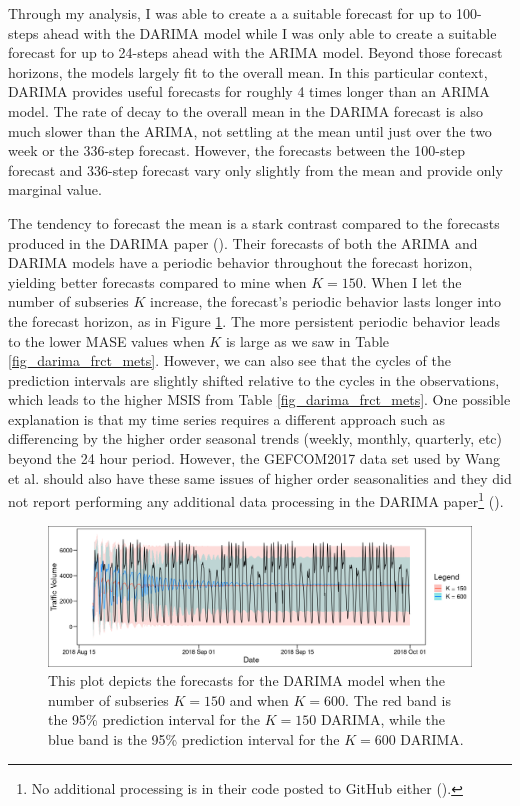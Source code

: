 \documentclass[
]{article}
\begin{document}
Through my analysis, I was able to create a a suitable forecast for up to 100-steps ahead with the DARIMA model while I was only able to create a suitable forecast for up to 24-steps ahead with the ARIMA model. Beyond those forecast horizons, the models largely fit to the overall mean. In this particular context, DARIMA provides useful forecasts for roughly 4 times longer than an ARIMA model. The rate of decay to the overall mean in the DARIMA forecast is also much slower than the ARIMA, not settling at the mean until just over the two week or the 336-step forecast. However, the forecasts between the 100-step forecast and 336-step forecast vary only slightly from the mean and provide only marginal value.

The tendency to forecast the mean is a stark contrast compared to the forecasts produced in the DARIMA paper (\cite[p.~28]{wang_distributed_2020}). Their forecasts of both the ARIMA and DARIMA models have a periodic behavior throughout the forecast horizon, yielding better forecasts compared to mine when $K = 150$. When I let the number of subseries $K$ increase, the forecast's periodic behavior lasts longer into the forecast horizon, as in Figure \ref{fig_darima_k150_k600}. The more persistent periodic behavior leads to the lower MASE values when $K$ is large as we saw in Table \ref{fig_darima_frct_mets}. However, we can also see that the cycles of the prediction intervals are slightly shifted relative to the cycles in the observations, which leads to the higher MSIS from Table \ref{fig_darima_frct_mets}. One possible explanation is that my time series requires a different approach such as differencing by the higher order seasonal trends (weekly, monthly, quarterly, etc) beyond the 24 hour period. However, the GEFCOM2017 data set used by Wang et al. should also have these same issues of higher order seasonalities and they did not report performing any additional data processing in the DARIMA paper\footnote{No additional processing is in their code posted to GitHub either (\cite{wang_xqnwang_github_2020}).} (\cite*{wang_distributed_2020}).

\begin{figure}[ht]
  \begin{center}
    \includegraphics{Plots/darima_k_150_k_600.png}
    \caption{This plot depicts the forecasts for the DARIMA model when the number of subseries $K = 150$ and when $K = 600$. The red band is the 95\% prediction interval for the $K = 150$ DARIMA, while the blue band is the 95\% prediction interval for the $K = 600$ DARIMA.}
    \label{fig_darima_k150_k600}
  \end{center}
\end{figure}
\end{document}
